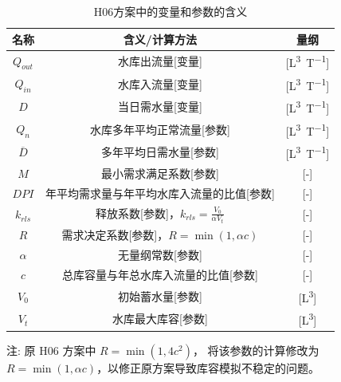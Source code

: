 \begin{table}[htbp]
    \centering
    \caption{H06方案中的变量和参数的含义}
    \label{tab:H06方案变量参数表}
    \begin{threeparttable}
    \begin{tabular}{ccc}
    \toprule
    名称 & 含义/计算方法 & 量纲 \\ \midrule
    $Q_{out}$  & 水库出流量[变量]  &
    [\unit{L^3.T^{-1}}]  \\   $Q_{in}$ & 水库入流量[变量] & [\unit{L^3.T^{-1}}] \\
    $D$ & 当日需水量[变量] & [\unit{L^3.T^{-1}}] \\
    $Q_n$  &  水库多年平均正常流量[参数] & [\unit{L^3.T^{-1}}] \\
    $\overline{D}$ & 多年平均日需水量[参数] &[\unit{L^3.T^{-1}}] \\
    $M$  & 最小需求满足系数[参数] & [-]  \\
    $DPI$  & 年平均需求量与年平均水库入流量的比值[参数] & [-]  \\
    $k_{rls}$ & 释放系数[参数]，$k_{rls} = \frac{V_0}{\alpha V_t}$ & [-]  \\
    $R$ & 需求决定系数[参数]，$R=\min(1, \alpha c)$ & [-]  \\
    $\alpha$ & 无量纲常数[参数] & [-]  \\
    $c$ & 总库容量与年总水库入流量的比值[参数] & [-]  \\
    $V_0$ & 初始蓄水量[参数] & [\unit{L^3}] \\
    $V_t$ & 水库最大库容[参数] & [\unit{L^3}] \\
    \bottomrule
    \end{tabular}
    \begin{tablenotes}
    \footnotesize
    \item[注:] 原 H06 方案中 $R=\min(1,4 c^2)$，\citet{Shin-etal_19} 将该参数的计算修改为 $R=\min(1,\alpha c)$，以修正原方案导致库容模拟不稳定的问题。
    \end{tablenotes}
    \end{threeparttable}
\end{table}

